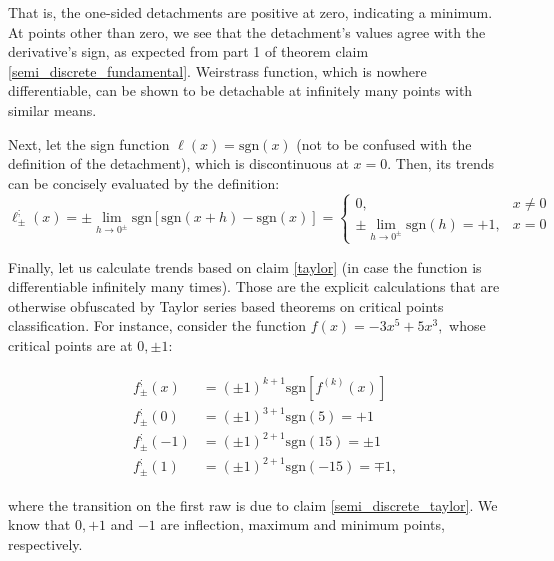 \documentclass[11pt]{book}
\begin{document}
That is, the one-sided detachments are positive at zero, indicating a minimum. At points other than zero, we see that the detachment’s values agree with the derivative’s sign, as expected from part 1 of theorem claim \ref{semi_discrete_fundamental}. Weirstrass function, which is nowhere differentiable, can be shown to be detachable at infinitely many points with similar means.

Next, let the sign function $\ell\left(x\right)=\text{sgn}\left(x\right)$ (not to be confused with the definition of the detachment), which is discontinuous at $x=0$. Then, its trends can be concisely evaluated by the definition:
$$\ell_{\pm}^{;}\left(x\right)=\pm \underset{{\scriptscriptstyle h\rightarrow0^{\pm}}}{\lim}\text{sgn}\left[\text{sgn}\left(x+h\right)-\text{sgn}\left(x\right)\right]=\begin{cases}
0, & x\neq0\\
\pm \underset{{\scriptscriptstyle h\rightarrow0^{\pm}}}{\lim}\text{sgn}\left(h\right)=+1, & x=0
\end{cases}$$

Finally, let us calculate trends based on claim \ref{taylor} (in case the function is differentiable infinitely many times). Those are the explicit calculations that are otherwise obfuscated by Taylor series based theorems on critical points classification. For instance, consider the function $f\left(x\right) = -3x^{5}+5x^{3},$ whose critical points are at $0, \pm 1$:

\begin{align}
&\begin{aligned}
f_{\pm}^{;}\left(x\right) & =\left(\pm1\right)^{k+1}\text{sgn}\left[f^{\left(k\right)}\left(x\right)\right]\\
f_{\pm}^{;}\left(0\right) & =\left(\pm1\right)^{3+1}\text{sgn}\left(5\right)=+1\\
f_{\pm}^{;}\left(-1\right) & =\left(\pm1\right)^{2+1}\text{sgn}\left(15\right)=\pm1\\
f_{\pm}^{;}\left(1\right) & =\left(\pm1\right)^{2+1}\text{sgn}\left(-15\right)=\mp1,
\end{aligned}
\end{align}

where the transition on the first raw is due to claim \ref{semi_discrete_taylor}. We know that $0, +1$ and $-1$ are inflection, maximum and minimum points, respectively.
\end{document}
